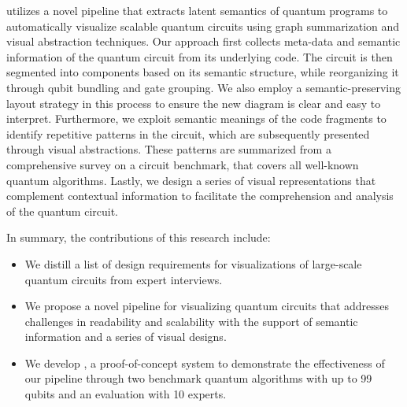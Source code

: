 {\tname} utilizes a novel pipeline that extracts latent semantics of quantum programs to automatically visualize scalable quantum circuits using graph summarization and visual abstraction techniques.
Our approach first collects meta-data and semantic information of the quantum circuit from its underlying code.
The circuit is then segmented into components based on its semantic structure, while reorganizing it through qubit bundling and gate grouping.
We also employ a semantic-preserving layout strategy in this process to ensure the new diagram is clear and easy to interpret.
Furthermore, we exploit semantic meanings of the code fragments to identify repetitive patterns in the circuit, which are subsequently presented through visual abstractions.
These patterns are summarized from a comprehensive survey on a circuit benchmark, that covers all well-known quantum algorithms.
Lastly, we design a series of visual representations that complement contextual information to facilitate the comprehension and analysis of the quantum circuit.

In summary, the contributions of this research include:

\begin{itemize}
    \item We distill a list of design requirements for visualizations of large-scale quantum circuits from expert interviews.
    \item We propose a novel pipeline for visualizing quantum circuits that addresses challenges in readability and scalability with the support of semantic information and a series of visual designs.
    \item We develop {\tname}, a proof-of-concept system to demonstrate the effectiveness of our pipeline through two benchmark quantum algorithms with up to {99} qubits and an evaluation with {10} experts.
\end{itemize}

